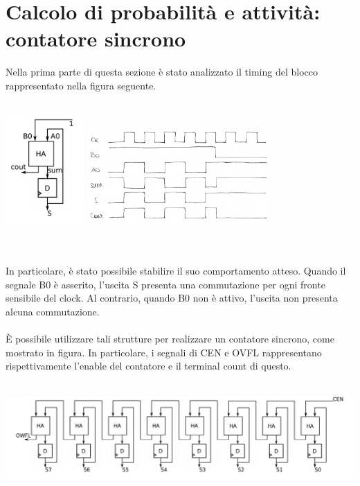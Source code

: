 \documentclass[11pt,  english, makeidx, a4paper, titlepage, oneside]{book}
\begin{document}
\section{Calcolo di probabilità e attività: contatore sincrono}
Nella prima parte di questa sezione è stato analizzato il timing del blocco 
rappresentato nella figura seguente.
\\\\
\centerline{\includegraphics[width=3cm]{./img/Lab_1/Es_5/Sync_FA.png}
			\includegraphics[width=7cm]{./img/Lab_1/Es_5/Half_add_contatore.png}}
\\\\
In particolare, è stato possibile stabilire il suo comportamento atteso. 
Quando il segnale B0 è asserito, l'uscita S presenta una commutazione 
per ogni fronte sensibile del clock. Al contrario, quando B0 non è attivo, 
l'uscita non presenta alcuna commutazione.
\\\\
È possibile utilizzare tali strutture per realizzare un contatore sincrono,
come mostrato in figura. In particolare, i segnali di CEN e OVFL rappresentano
rispettivamente l'enable del contatore e il terminal count di questo.
\\\\
\centerline{\includegraphics[width=15cm]{./img/Lab_1/Es_5/Counter.png}}
\\\\
\end{document}
